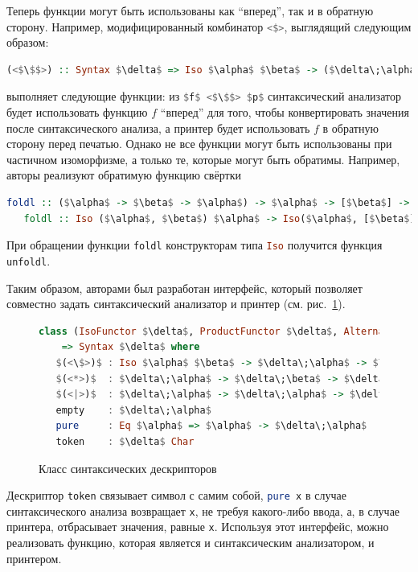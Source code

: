 Теперь функции могут быть использованы как ``вперед'', так и в обратную сторону. Например, модифицированный комбинатор 
\lstinline[language=Haskell]{<$>}, выглядящий следующим образом:

\begin{lstlisting}[language=Haskell,mathescape]
   (<$\$$>) :: Syntax $\delta$ => Iso $\alpha$ $\beta$ -> ($\delta\;\alpha$ -> $\delta\;\beta$)
\end{lstlisting}

\noindent выполняет следующие функции: из \lstinline[language=Haskell,mathescape]{$f$ <$\$$> $p$} синтаксический анализатор будет 
использовать функцию $f$ ``вперед'' для того, чтобы конвертировать значения после синтаксического анализа, а принтер будет использовать 
$f$ в обратную сторону перед печатью. Однако не все функции могут быть использованы при частичном изоморфизме, а только те, 
которые могут быть обратимы. Например, авторы реализуют обратимую функцию свёртки

\begin{lstlisting}[mathescape,language=Haskell]
   foldl :: ($\alpha$ -> $\beta$ -> $\alpha$) -> $\alpha$ -> [$\beta$] -> $\alpha$
   foldl :: Iso ($\alpha$, $\beta$) $\alpha$ -> Iso($\alpha$, [$\beta$]) $\alpha$
\end{lstlisting}

При обращении функции \lstinline{foldl} конструкторам типа \lstinline[language=Haskell]{Iso} получится функция \lstinline{unfoldl}.

Таким образом, авторами был разработан интерфейс, который позволяет совместно задать синтаксический анализатор и принтер (см. рис.~\ref{ClassSyntDesc}).

\begin{figure}[ht]
\centering
\begin{lstlisting}[mathescape,language = haskell]
class (IsoFunctor $\delta$, ProductFunctor $\delta$, Alternative $\delta$) 
    => Syntax $\delta$ where
   $(<\$>)$ : Iso $\alpha$ $\beta$ -> $\delta\;\alpha$ -> $\delta\;\beta$
   $(<*>)$  : $\delta\;\alpha$ -> $\delta\;\beta$ -> $\delta$ ($\alpha$, $\beta$)
   $(<|>)$  : $\delta\;\alpha$ -> $\delta\;\alpha$ -> $\delta\;\alpha$
   empty    : $\delta\;\alpha$
   pure     : Eq $\alpha$ => $\alpha$ -> $\delta\;\alpha$
   token    : $\delta$ Char
\end{lstlisting}
\caption{Класс синтаксических дескрипторов}
\label{ClassSyntDesc}
\end{figure}

Дескриптор \lstinline[language=Haskell]{token} связывает символ с самим собой, \lstinline[language=Haskell]{pure x} 
в случае синтаксического анализа возвращает \lstinline[language=Haskell]{x}, не требуя какого-либо ввода, а, в случае 
принтера, отбрасывает значения, равные \lstinline[language=Haskell]{x}. Используя этот интерфейс, можно 
реализовать функцию, которая является и синтаксическим анализатором, и принтером.

